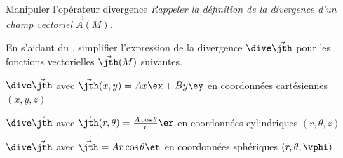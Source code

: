 \begin{exo}[PC][1][appli]{Manipuler l'opérateur divergence}
  \emph{Rappeler la définition de la divergence d'un champ vectoriel $\Vec{A}(M)$.}
  \hauteurLargeurCadreReponse		{9mm}{6cm}

  En s'aidant du , simplifier l'expression de la divergence $\dive \Vec{\jth}$ pour les fonctions vectorielles $\Vec{\jth}(M)$ suivantes.

\begin{enonce}
  $\dive \Vec{\jth}$ avec $\Vec{\jth}(x,y)=Ax\ex + By\ey$ en coordonnées cartésiennes $(x,y,z)$\\

\end{enonce}


\begin{enonce}
  $\dive \Vec{\jth}$ avec $\Vec{\jth}(r,\theta)= \frac{A\cos \theta}{r} \er$ en coordonnées cylindriques $(r,\theta,z)$\\ 

\end{enonce}


\begin{enonce}
  $\dive \Vec{\jth}$ avec $\Vec{\jth}= Ar\cos \theta \et $ en coordonnées sphériques $(r,\theta,\vphi)$\\ 
  
\end{enonce}


\end{exo}

